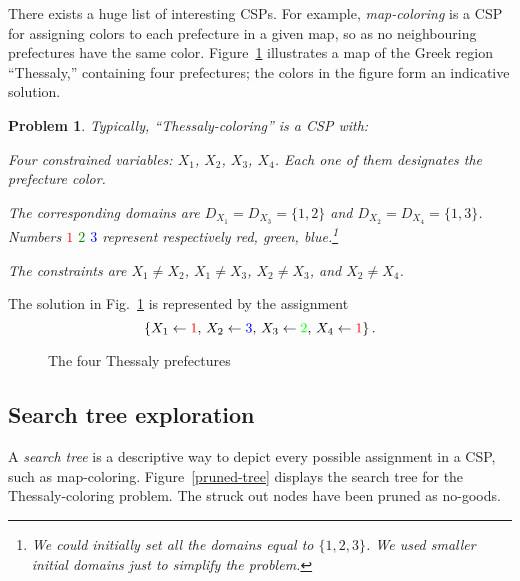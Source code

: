 \documentclass{ws-ijait}
\newtheorem{problem}{Problem}
\begin{document}
There exists a huge list of interesting CSPs.\cite{CSPLib}
For example, \emph{map-coloring} is a CSP for assigning
colors to each prefecture in a given map, so as no
neighbouring prefectures have the same color.
Figure~\ref{map-colored} illustrates a map of the Greek
region ``Thessaly,'' containing four prefectures; the colors
in the figure form an indicative solution.
\begin{problem}
  \label{thessaly-coloring}
  Typically, \emph{``Thessaly-coloring''} is a CSP with:
  \begin{romanlist}
    \item Four constrained variables: $X_1$, $X_2$, $X_3$,
          $X_4$. Each one of them designates the prefecture
          color.
    \item The corresponding domains are $D_{X_1} = D_{X_3} =
          \{1,2\}$ and $D_{X_2} = D_{X_4} = \{1,3\}$.
          Numbers \textcolor{red}{$1$}
          \textcolor{green}{$2$} \textcolor{blue}{$3$}
          represent respectively red, green,
          blue.\footnote{We could initially set all the
          domains equal to $\{1, 2, 3\}$. We used smaller
          initial domains just to simplify the problem.}
    \item The constraints are $X_1 \neq X_2$, $X_1 \neq
          X_3$, $X_2 \neq X_3$, and $X_2 \neq X_4$.
  \end{romanlist}
\end{problem}
The solution in Fig.~\ref{map-colored} is represented by the
assignment
\begin{equation}
  \label{solution}
  \{ X_1 \gets \textcolor{red}{1}, \, X_2 \gets
  \textcolor{blue}{3}, \, X_3 \gets \textcolor{green}{2}, \,
  X_4 \gets \textcolor{red}{1} \} \, .
\end{equation}

\begin{figure}
  \centering
  
  \caption{The four Thessaly prefectures\label{map-colored}}
\end{figure}

\subsection{Search tree exploration}

A \emph{search tree} is a descriptive way to depict every
possible assignment in a CSP, such as map-coloring.
Figure~\ref{pruned-tree} displays the search tree for the
Thessaly-coloring problem. The struck out nodes have been
pruned as no-goods.
\end{document}
